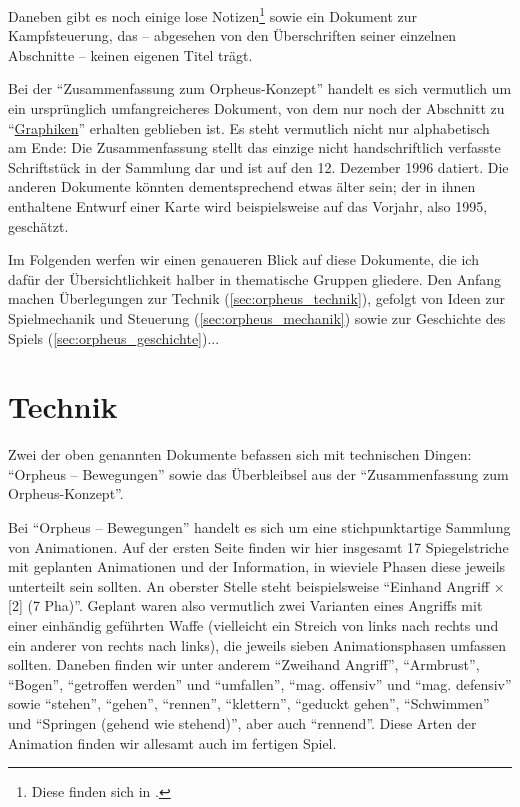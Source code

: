 \documentclass[12pt]{scrbook}
\begin{document}
\noindent Daneben gibt es noch einige lose Notizen\footnote{Diese finden sich in \autocite{orpheus_b_scribbles}.} sowie ein Dokument zur Kampfsteuerung,\autocite{orpheus_kampfsteuerung} das -- abgesehen von den Überschriften seiner einzelnen Abschnitte -- keinen eigenen Titel trägt.

Bei der \enquote{Zusammenfassung zum Orpheus-Konzept} handelt es sich vermutlich um ein ursprünglich umfangreicheres Dokument, von dem nur noch der Abschnitt zu \enquote{\uline{Graphiken}} erhalten geblieben ist. \autocite[Vgl.][]{archive_orpheus}
Es steht vermutlich nicht nur alphabetisch am Ende:
Die Zusammenfassung stellt das einzige nicht handschriftlich verfasste Schriftstück in der Sammlung dar und ist auf den 12. Dezember 1996 datiert.
Die anderen Dokumente könnten dementsprechend etwas älter sein; der in ihnen enthaltene Entwurf einer Karte wird beispielsweise auf das Vorjahr, also 1995, geschätzt.\autocite{flosha_evolution}

Im Folgenden werfen wir einen genaueren Blick auf diese Dokumente, die ich dafür der Übersichtlichkeit halber in thematische Gruppen gliedere.
Den Anfang machen Überlegungen zur Technik (\autoref{sec:orpheus_technik}), gefolgt von Ideen zur Spielmechanik und Steuerung (\autoref{sec:orpheus_mechanik}) sowie zur Geschichte des Spiels (\autoref{sec:orpheus_geschichte})...


\section{Technik}\label{sec:orpheus_technik}
Zwei der oben genannten Dokumente befassen sich mit technischen Dingen:
\enquote{Orpheus -- Bewegungen} sowie das Überbleibsel aus der \enquote{Zusammenfassung zum Orpheus-Konzept}.

Bei \enquote{Orpheus -- Bewegungen} handelt es sich um eine stichpunktartige Sammlung von Animationen.
Auf der ersten Seite finden wir hier insgesamt 17 Spiegelstriche mit geplanten Animationen und der Information, in wieviele Phasen diese jeweils unterteilt sein sollten.
An oberster Stelle steht beispielsweise \enquote{Einhand Angriff × [2] (7 Pha)}.\autocite[S.~1]{orpheus_bewegungen}
Geplant waren also vermutlich zwei Varianten eines Angriffs mit einer einhändig geführten Waffe (vielleicht ein Streich von links nach rechts und ein anderer von rechts nach links), die jeweils sieben Animationsphasen umfassen sollten.
Daneben finden wir unter anderem \enquote{Zweihand Angriff}, \enquote{Armbrust}, \enquote{Bogen}, \enquote{getroffen werden} und \enquote{umfallen}, \enquote{mag. offensiv} und \enquote{mag. defensiv} sowie \enquote{stehen}, \enquote{gehen}, \enquote{rennen}, \enquote{klettern}, \enquote{geduckt gehen}, \enquote{Schwimmen} und \enquote{Springen (gehend wie stehend)}, aber auch \enquote{rennend}.\autocite[S.~1]{orpheus_bewegungen}
Diese Arten der Animation finden wir allesamt auch im fertigen Spiel. %
\end{document}
